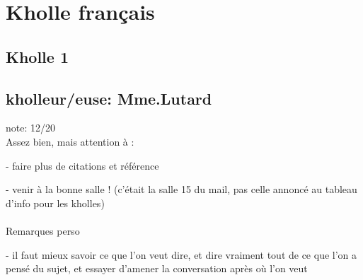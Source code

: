 \documentclass{article}
\begin{document}
\section{Kholle français}

\subsection{Kholle 1}
\subsection{kholleur/euse: Mme.Lutard}

note: 12/20 \\

Assez bien, mais attention à :

- faire plus de citations et référence

- venir à la bonne salle ! (c'était la salle 15 du mail, pas celle annoncé au tableau d'info pour les kholles) \\ \\
Remarques perso

- il faut mieux savoir ce que l'on veut dire, et dire vraiment tout de ce que l'on a pensé du sujet, et essayer d'amener la conversation après où l'on veut
\end{document}

